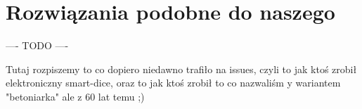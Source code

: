 \section{Rozwiązania podobne do naszego}

    ---- TODO ----

Tutaj rozpiszemy to co dopiero niedawno trafiło na issues, czyli to jak ktoś zrobił elektroniczny smart-dice,
oraz to jak ktoś zrobił to co nazwaliśm y wariantem "betoniarka" ale z 60 lat temu ;)